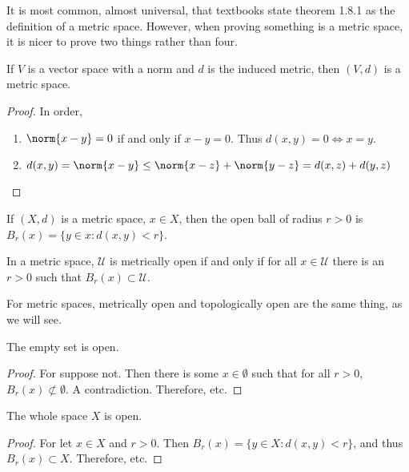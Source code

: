             It is most common, almost universal, that textbooks state theorem
            1.8.1 as the definition of a metric space. However, when proving
            something is a metric space, it is nicer to prove two things rather
            than four.
            \begin{theorem}
            If $V$ is a vector space with a norm and $d$ is the induced metric, then $(V,d)$ is a metric space.
            \end{theorem}
            \begin{proof}
            In order,
            \begin{enumerate}
            \item $\norm{x-y} = 0$ if and only if $x-y = 0$. Thus $d(x,y) = 0 \Leftrightarrow x=y$.
            \item $d(x,y) = \norm{x-y}\leq \norm{x-z}+\norm{y-z} = d(x,z)+d(y,z)$
            \end{enumerate}
            \end{proof}
            \begin{definition}
            If $(X,d)$ is a metric space, $x\in X$, then the open ball of radius $r>0$ is $B_{r}(x) = \{y\in x: d(x,y)<r\}$.
            \end{definition}
            \begin{definition}
            In a metric space, $\mathcal{U}$ is metrically open if and only if for all $x\in \mathcal{U}$ there is an $r>0$ such that $B_{r}(x)\subset \mathcal{U}$.
            \end{definition}
            For metric spaces, metrically open and topologically open are the
            same thing, as we will see.
            \begin{theorem}
            The empty set is open.
            \end{theorem}
            \begin{proof}
            For suppose not. Then there is some $x\in \emptyset$ such that for all $r>0$, $B_{r}(x)\not\subset \emptyset$. A contradiction. Therefore, etc.
            \end{proof}
            \begin{theorem}
            The whole space $X$ is open.
            \end{theorem}
            \begin{proof}
            For let $x\in X$ and $r>0$. Then $B_{r}(x) = \{y\in X:d(x,y)<r\}$, and thus $B_{r}(x)\subset X$. Therefore, etc.
            \end{proof}
